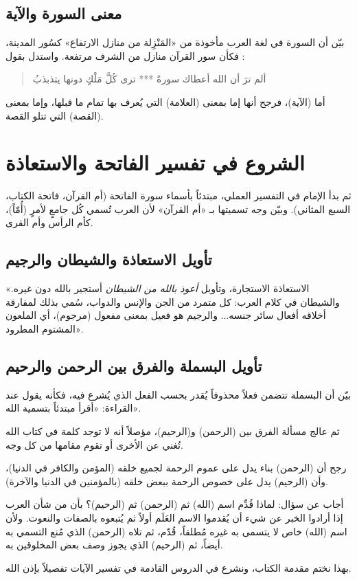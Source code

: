 \subsection{معنى السورة والآية}
بيّن  أن السورة في لغة العرب مأخوذة من «المَنْزِلة من منازل الارتفاع» كسُور المدينة، فكأن سور القرآن منازل من الشرف مرتفعة. واستدل بقول :
\begin{quote}
ألم ترَ أن الله أعطاك سورةً *** ترى كُلَّ مَلْكٍ دونها يتذبذبُ
\end{quote}

أما (الآية)، فرجح أنها إما بمعنى (العلامة) التي يُعرف بها تمام ما قبلها، وإما بمعنى (القصة) التي تتلو القصة.

\separator

\section{الشروع في تفسير الفاتحة والاستعاذة}
ثم بدأ الإمام  في التفسير العملي، مبتدئاً بأسماء سورة الفاتحة (أم القرآن، فاتحة الكتاب، السبع المثاني). وبيّن وجه تسميتها بـ «أم القرآن» لأن العرب تُسمي كُل جامعٍ لأمرٍ (أُمّاً)، كأم الرأس وأم القرى.

\subsection{تأويل الاستعاذة والشيطان والرجيم}
 «الاستعاذة الاستجارة، وتأويل \textit{أعوذ بالله من الشيطان} أستجير بالله دون غيره. والشيطان في كلام العرب: كل متمرد من الجن والإنس والدواب، سُمي بذلك لمفارقة أخلاقه أفعال سائر جنسه... والرجيم هو فعيل بمعنى مفعول (مرجوم)، أي الملعون المشتوم المطرود».

\subsection{تأويل البسملة والفرق بين الرحمن والرحيم}
بيّن  أن البسملة تتضمن فعلاً محذوفاً يُقدر بحسب الفعل الذي يُشرع فيه، فكأنه يقول عند القراءة: «أقرأ مبتدئاً بتسمية الله».

ثم عالج مسألة الفرق بين (الرحمن) و(الرحيم)، مؤصلاً أنه لا توجد كلمة في كتاب الله تُغني عن الأخرى أو تقوم مقامها من كل وجه.

\begin{fawaid}
رجح  أن (الرحمن) بناء يدل على عموم الرحمة لجميع خلقه (المؤمن والكافر في الدنيا)، وأن (الرحيم) يدل على خصوص الرحمة ببعض خلقه (بالمؤمنين في الدنيا والآخرة).
\end{fawaid}

\begin{fawaid}
أجاب  عن سؤال: لماذا قُدِّم اسم (الله) ثم (الرحمن) ثم (الرحيم)؟ بأن من شأن العرب إذا أرادوا الخبر عن شيء أن يُقدموا الاسم العَلَم أولاً ثم يُتبعوه بالصفات والنعوت. ولأن اسم (الله) خاص لا يتسمى به غيره مُطلقاً، قُدّم، ثم تلاه (الرحمن) الذي مُنع التسمي به أيضاً، ثم (الرحيم) الذي يجوز وصف بعض المخلوقين به.
\end{fawaid}

بهذا نختم مقدمة الكتاب، ونشرع في الدروس القادمة في تفسير الآيات تفصيلاً بإذن الله.
